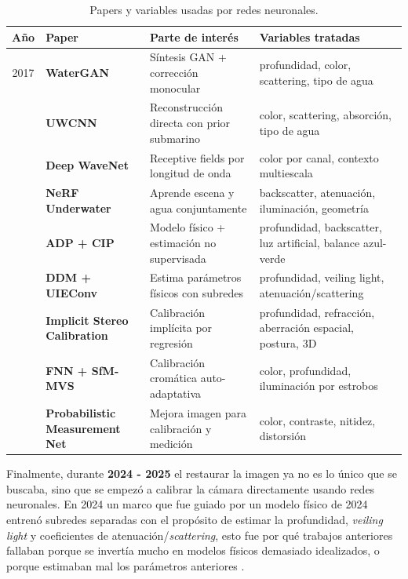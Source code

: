 \documentclass[12pt,letterpaper,spanish,twoside,openright]{report}
\begin{document}
\begin{table}[htbp]
  \centering
  \caption{Papers y variables usadas por redes neuronales.}
  \label{tab:estado_del_arte}
  \small
  \begin{tabularx}{\textwidth}{c l X X}
    \toprule
    \textbf{Año} & \textbf{Paper} & \textbf{Parte de interés} & \textbf{Variables tratadas} \\
    \midrule
    2017 & \textbf{WaterGAN} & Síntesis GAN + corrección monocular & profundidad, color, scattering, tipo de agua \parencite{7995024} \\
    \addlinespace
    2020 & \textbf{UWCNN} & Reconstrucción directa con prior submarino & color, scattering, absorción, tipo de agua \parencite{LI2020107038} \\
    \addlinespace
    2021 & \textbf{Deep WaveNet} & Receptive fields por longitud de onda & color por canal, contexto multiescala \parencite{10.1145/3511021} \\
    \addlinespace
    2023 & \textbf{NeRF Underwater} & Aprende escena y agua conjuntamente & backscatter, atenuación, iluminación, geometría \parencite{10225666} \\
    \addlinespace
    2023 & \textbf{ADP + CIP} & Modelo físico + estimación no supervisada & profundidad, backscatter, luz artificial, balance azul-verde \parencite{Zhou2025} \\
    \addlinespace
    2024 & \textbf{DDM + UIEConv} & Estima parámetros físicos con subredes & profundidad, veiling light, atenuación/scattering \parencite{11435170} \\
    \addlinespace
    2024 & \textbf{Implicit Stereo Calibration} & Calibración implícita por regresión & profundidad, refracción, aberración espacial, postura, 3D \parencite{Meng:24} \\
    \addlinespace
    2024 & \textbf{FNN + SfM-MVS} & Calibración cromática auto-adaptativa & color, profundidad, iluminación por estrobos \parencite{rs16071279} \\
    \addlinespace
    2025 & \textbf{Probabilistic Measurement Net} & Mejora imagen para calibración y medición & color, contraste, nitidez, distorsión \parencite{Zhou2025Probabilistic} \\
    \bottomrule
  \end{tabularx}
\end{table}

Finalmente, durante \textbf{2024 - 2025} el restaurar la imagen ya no es lo único que se buscaba, sino que se empezó a calibrar la cámara directamente usando redes neuronales. En 2024 un marco que fue guiado por un modelo físico de 2024 entrenó subredes separadas con el propósito de estimar la profundidad, \textit{veiling light} y coeficientes de atenuación/\textit{scattering}, esto fue por qué trabajos anteriores fallaban porque se invertía mucho en modelos físicos demasiado idealizados, o porque estimaban mal los parámetros anteriores \parencite{11435170}.
\end{document}
